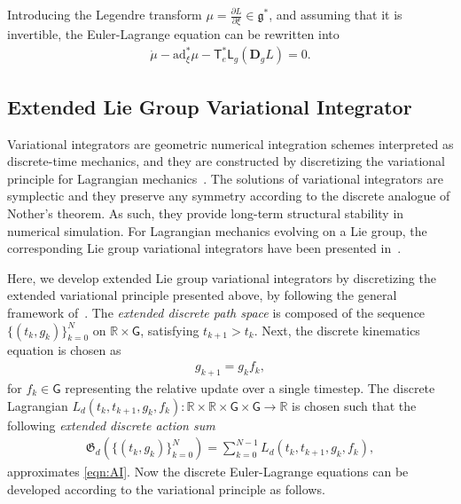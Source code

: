 \documentclass[letterpaper, 10pt, conference]{ieeeconf}
\newcommand{\deriv}[2]{\ensuremath{\frac{\partial #1}{\partial #2}}}
\newcommand{\G}{\ensuremath{\mathsf{G}}}
\newcommand{\T}{\ensuremath{\mathsf{T}}}
\renewcommand{\L}{\ensuremath{\mathsf{L}}}
\renewcommand{\Re}{\ensuremath{\mathbb{R}}}
\newcommand{\D}{\ensuremath{\mathbf{D}}}
\newcommand{\ad}{\ensuremath{\mathrm{ad}}}
\newcommand{\g}{\ensuremath{\mathfrak{g}}}
\begin{document}
Introducing the Legendre transform $\mu = \deriv{L}{\xi} \in\g^*$, and assuming that it is invertible, the Euler-Lagrange equation can be rewritten into
\begin{align}
    \dot \mu - \ad^*_{\xi} \mu - \T^*_e \L_g (\D_g L) = 0. \label{eqn:HE}
\end{align}

\subsection{Extended Lie Group Variational Integrator}

Variational integrators are geometric numerical integration schemes interpreted as discrete-time mechanics, and they are constructed by discretizing the variational principle for Lagrangian mechanics~\cite{MarWesAN01}.
The solutions of variational integrators are symplectic and they preserve any symmetry according to the discrete analogue of Nother's theorem.
As such, they provide long-term structural stability in numerical simulation. 
For Lagrangian mechanics evolving on a Lie group, the corresponding Lie group variational integrators have been presented in~\cite{Leo04,Lee08,LeeLeoCMAME07}.

Here, we develop extended Lie group variational integrators by discretizing the extended variational principle presented above, by following the general framework of~\cite{MarWesAN01}.
The \textit{extended discrete path space} is composed of the sequence $\{(t_k, g_k)\}_{k=0}^N$ on $\Re\times\G$, satisfying $t_{k+1}>t_k$.
Next, the discrete kinematics equation is chosen as
\begin{align}
    g_{k+1} = g_k f_k, \label{eqn:gkp}
\end{align}
for $f_k \in\G$ representing the relative update over a single timestep. 
The discrete Lagrangian $L_d(t_k, t_{k+1}, g_k, f_k): \Re\times\Re\times\G\times\G\rightarrow \Re$ is chosen such that the following \textit{extended discrete action sum}
\begin{align}
    \mathfrak{G}_d(\{(t_k, g_k)\}_{k=0}^N) = \sum_{k=0}^{N-1} L_d(t_k, t_{k+1}, g_k, f_k), \label{eqn:Gd}
\end{align}
approximates \eqref{eqn:AI}. 
Now the discrete Euler-Lagrange equations can be developed according to the variational principle as follows.
\end{document}
